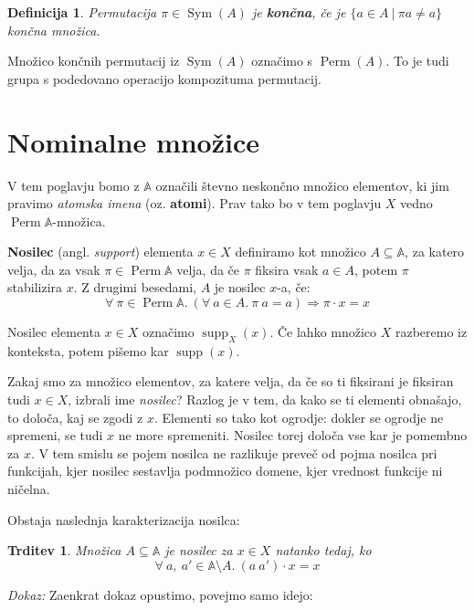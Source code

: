 \documentclass{article}
\DeclareMathOperator{\Sym}{Sym}
\DeclareMathOperator{\Perm}{Perm}
\DeclareMathOperator{\supp}{supp}
\newtheorem{trditev}{Trditev}
\newtheorem{definicija}{Definicija}
\begin{document}
\begin{definicija}
Permutacija \(\pi \in \Sym(A)\) je \textbf{končna}, če je \(\{a \in A\ |\ \pi a \neq a\}\) končna množica.
\end{definicija}

Množico končnih permutacij iz \(\Sym(A)\) označimo s \(\Perm(A)\). To je tudi grupa s podedovano operacijo kompozituma permutacij.


\section{Nominalne množice}

V tem poglavju bomo z \(\mathds{A}\) označili števno neskončno množico elementov, ki jim pravimo \emph{atomska imena} (oz. \textbf{atomi}).
Prav tako bo v tem poglavju \(X\) vedno \(\Perm \mathds{A}\)-množica.

\textbf{Nosilec} (angl. \emph{support}) elementa \(x \in X\) definiramo kot množico \(A \subseteq \mathds{A}\), za katero velja, da za vsak \(\pi \in \Perm \mathds{A}\) velja, da če \(\pi\) fiksira vsak \(a \in A\), potem \(\pi\) stabilizira \(x\). Z drugimi besedami, \(A\) je nosilec \(x\)-a, če:
\[
    \forall\ \pi \in \Perm \mathds{A}.\ (\forall\ a \in A.\ \pi\ a = a) \Rightarrow \pi \cdot x = x
\]

Nosilec elementa \(x \in X\) označimo \(\supp_X(x)\). Če lahko množico \(X\) razberemo iz konteksta, potem pišemo kar \(\supp(x)\).

Zakaj smo za množico elementov, za katere velja, da če so ti fiksirani je fiksiran tudi \(x \in X\), izbrali ime \emph{nosilec}? Razlog je v tem, da kako se ti elementi obnašajo, to določa, kaj se zgodi z \(x\). Elementi so tako kot ogrodje: dokler se ogrodje ne spremeni, se tudi \(x\) ne more spremeniti. Nosilec torej določa vse kar je pomembno za \(x\). V tem smislu se pojem nosilca ne razlikuje preveč od pojma nosilca pri funkcijah, kjer nosilec sestavlja podmnožico domene, kjer vrednost funkcije ni ničelna.


Obstaja naslednja karakterizacija nosilca:

\begin{trditev}
    Množica \(A \subseteq \mathds{A}\) je nosilec za \(x \in X\) natanko tedaj, ko 
    \[
        \forall\ a,\ a' \in \mathds{A}\setminus A.\ (a\ a') \cdot x = x
    \]
\end{trditev}

\noindent
{\em Dokaz:\/} Zaenkrat dokaz opustimo, povejmo samo idejo:
\end{document}
